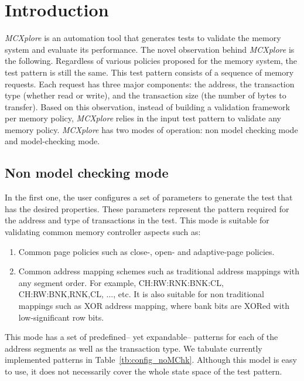 


\section{Introduction}
\textit{MCXplore} is an automation tool that generates tests to validate the memory system and evaluate its performance. 
The novel observation behind \textit{MCXplore} is the following. 
Regardless of various policies proposed for the memory system, the test pattern is still the same. 
This test pattern consists of a sequence of memory requests. 
Each request has three major components: the address, the transaction type (whether read or write), and the transaction size (the number of bytes to transfer). 
Based on this observation, instead of building a validation framework per memory policy, \textit{MCXplore} relies in the input test pattern to validate any memory policy. 
\textit{MCXplore} has two modes of operation: non model checking mode and model-checking mode.
\subsection{Non model checking mode}
In the first one, the user configures a set of parameters to generate the test that has the desired properties. 
These parameters represent the pattern required for the address and type of transactions in the test. 
This mode is suitable for validating common memory controller aspects such as:
\begin{enumerate}
\item Common page policies such as close-, open- and adaptive-page policies. 

\item Common address mapping schemes such as traditional address mappings with any segment order. For example, CH:RW:RNK:BNK:CL, CH:RW:BNK,RNK,CL, ..., etc. 
It is also suitable for non traditional mappings such as XOR address mapping, where bank bits are XORed with low-significant row bits. 

\end{enumerate}  

This mode has a set of predefined-- yet expandable-- patterns for each of the address segments as well as the transaction type. 
We tabulate currently implemented patterns in Table~\ref{tb:config_noMChk}. 
Although this model is easy to use, it does not necessarily cover the whole state space of the test pattern. 

